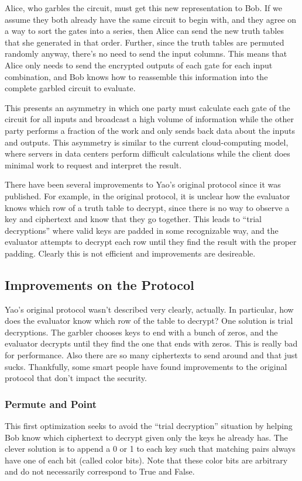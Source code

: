 Alice, who garbles the circuit, must get this new representation to Bob. If we assume they both already have the same circuit to begin with, and they agree on a way to sort the gates into a series, then Alice can send the new truth tables that she generated in that order. Further, since the truth tables are permuted randomly anyway, there's no need to send the input columns. This means that Alice only needs to send the encrypted outputs of each gate for each input combination, and Bob knows how to reassemble this information into the complete garbled circuit to evaluate.

This presents an asymmetry in which one party must calculate each gate of the circuit for all inputs and broadcast a high volume of information while the other party performs a fraction of the work and only sends back data about the inputs and outputs. This asymmetry is similar to the current cloud-computing model, where servers in data centers perform difficult calculations while the client does minimal work to request and interpret the result.

There have been several improvements to Yao's original protocol since it was published\cite{gentle}. For example, in the original protocol, it is unclear how the evaluator knows which row of a truth table to decrypt, since there is no way to observe a key and ciphertext and know that they go together. This leads to ``trial decryptions'' where valid keys are padded in some recognizable way, and the evaluator attempts to decrypt each row until they find the result with the proper padding. Clearly this is not efficient and improvements are desireable.

\subsection{Improvements on the Protocol}
Yao's original protocol wasn't described very clearly, actually. In particular, how does the evaluator know which row of the table to decrypt? One solution is trial decryptions. The garbler chooses keys to end with a bunch of zeros, and the evaluator decrypts until they find the one that ends with zeros. This is really bad for performance. Also there are so many ciphertexts to send around and that just sucks. Thankfully, some smart people have found improvements to the original protocol that don't impact the security.

\subsubsection{Permute and Point}
This first optimization seeks to avoid the ``trial decryption'' situation by helping Bob know which ciphertext to decrypt given only the keys he already has. The clever solution is to append a 0 or 1 to each key such that matching pairs always have one of each bit (called color bits)\cite{gentle}. Note that these color bits are arbitrary and do not necessarily correspond to True and False.

